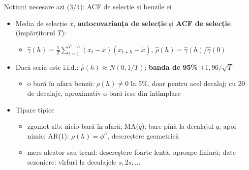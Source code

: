 \begin{frame}{Noțiuni necesare azi (3/4): ACF de selecție și benzile ei}
\itemsize{\small}
\begin{itemize}
    \item Media de selecție $\bar x$, \textbf{autocovarianța de selecție} și \textbf{ACF de selecție} (împărțitorul $T$):
    \begin{itemize}
        \item $\hat\gamma(h) = \frac1T\sum_{t=1}^{T-h}(x_t - \bar x)(x_{t+h} - \bar x)$, \quad $\hat\rho(h) = \hat\gamma(h)/\hat\gamma(0)$
    \end{itemize}
    \item Dacă seria este i.i.d.: $\hat\rho(h) \approx N(0, 1/T)$; \textbf{banda de 95\%} $\pm 1{,}96/\sqrt{T}$
    \begin{itemize}
        \item o bară în afara benzii: $\rho(h) \ne 0$ la 5\%, doar pentru acel decalaj; cu 20 de decalaje, aproximativ o bară iese din întîmplare
    \end{itemize}
    \item Tipare tipice
    \begin{itemize}
        \item zgomot alb: nicio bară în afară; MA($q$): bare pînă la decalajul $q$, apoi nimic; AR(1): $\rho(h) = \phi^h$, descreștere geometrică
        \item mers aleator sau trend: descreștere foarte lentă, aproape liniară; date sezoniere: vîrfuri la decalajele $s, 2s, \dots$
    \end{itemize}
\end{itemize}
\end{frame}

